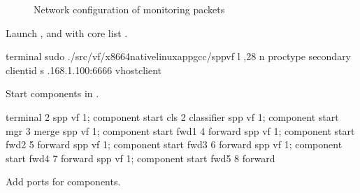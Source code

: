 \documentclass[a4paper,11pt,openany,oneside,english]{sphinxmanual}
\begin{document}
\begin{figure}[htbp]
\centering
\capstart

\noindent{}
\caption{Network configuration of monitoring packets}\label{\detokenize{usecases/spp_mirror:id6}}\label{\detokenize{usecases/spp_mirror:figure-usecase-monitor-nwconfig}}\end{figure}

Launch ,  and  with core list .

\begin{sphinxVerbatim}[commandchars=\\\{\},formatcom=\footnotesize]
 terminal 
 sudo ./src/vf/x86\PYGZus{}64\PYGZhy{}native\PYGZhy{}linuxapp\PYGZhy{}gcc/spp\PYGZus{}vf 
    \PYGZhy{}l ,2\PYGZhy{}8 
    \PYGZhy{}n  \PYGZhy{}\PYGZhy{}proc\PYGZhy{}type secondary 
    \PYGZhy{}\PYGZhy{} 
    \PYGZhy{}\PYGZhy{}client\PYGZhy{}id  
    \PYGZhy{}s .168.1.100:6666 
    \PYGZhy{}\PYGZhy{}vhost\PYGZhy{}client
\end{sphinxVerbatim}

Start components in .

\begin{sphinxVerbatim}[commandchars=\\\{\},formatcom=\footnotesize]
\PYGZsh{} terminal 2
spp \PYGZgt{} vf 1; component start cls 2 classifier
spp \PYGZgt{} vf 1; component start mgr 3 merge
spp \PYGZgt{} vf 1; component start fwd1 4 forward
spp \PYGZgt{} vf 1; component start fwd2 5 forward
spp \PYGZgt{} vf 1; component start fwd3 6 forward
spp \PYGZgt{} vf 1; component start fwd4 7 forward
spp \PYGZgt{} vf 1; component start fwd5 8 forward
\end{sphinxVerbatim}

Add ports for components.
\end{document}
